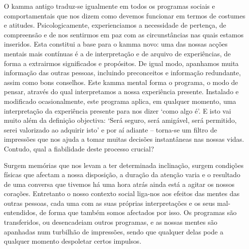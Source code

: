 O kamma antigo traduz-se igualmente em todos os programas sociais e
comportamentais que nos dizem como devemos funcionar em termos de costumes e
atitudes. Psicologicamente, experienciamos a necessidade de pertença, de
compreensão e de nos sentirmos em paz com as circunstâncias nas quais estamos
inseridos. Esta constitui a base para o kamma novo: uma das nossas acções
mentais mais contínuas é a de interpretação e de arquivo de experiências, de
forma a extrairmos significados e propósitos. De igual modo, apanhamos muita
informação das outras pessoas, incluindo preconceitos e informação redundante,
assim como bons conselhos. Este kamma mental forma o programa, o modo de pensar,
através do qual interpretamos a nossa experiência presente. Instalado e
modificado ocasionalmente, este programa aplica, em qualquer momento, uma
interpretação da experiência presente para nos dizer `como algo é'. E isto vai
muito além da definição objectiva: `Será seguro, será amigável, será permitido,
serei valorizado ao adquirir isto' e por aí adiante -- torna-se um filtro de
impressões que nos ajuda a tomar muitas decisões instantâneas nas nossas vidas.
Contudo, qual a fiabilidade deste processo crucial?

Surgem memórias que nos levam a ter determinada inclinação, surgem condições
físicas que afectam a nossa disposição, a duração da atenção varia e o resultado
de uma conversa que tivemos há uma hora atrás ainda está a agitar os nossos
corações. Entretanto o nosso contexto social liga-nos aos efeitos das mentes das
outras pessoas, cada uma com as suas próprias interpretações e os seus
mal-entendidos, de forma que também somos afectados por isso. Os programas são
transferidos, ou desencadeiam outros programas, e as nossas mentes são apanhadas
num turbilhão de impressões, sendo que qualquer delas pode a qualquer momento
despoletar certos impulsos.


